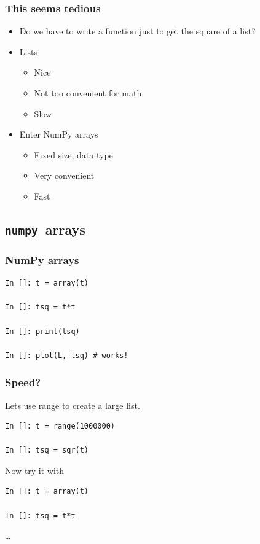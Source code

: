 \documentclass[14pt,compress]{beamer}
\newcounter{time}
\newcommand{\inctime}[1]{\addtocounter{time}{#1}{\tiny \thetime\ m}}
\newcommand{\num}{\texttt{numpy}}
\begin{document}
\begin{frame}[fragile]
  \frametitle{This seems tedious}

  \begin{itemize}
  \item Do we have to write a function just to get the square of a list?
    \item Lists
\begin{itemize}
    \item Nice
    \item Not too convenient for math
    \item Slow
\end{itemize}
\item Enter NumPy arrays
    \begin{itemize}
        \item Fixed size, data type
        \item Very convenient
        \item Fast
    \end{itemize}
  \end{itemize}
  \inctime{10}
\end{frame}

\subsection{\num\ arrays}

\begin{frame}[fragile]
\frametitle{NumPy arrays}
\begin{lstlisting}
In []: t = array(t)

In []: tsq = t*t

In []: print(tsq)

In []: plot(L, tsq) # works!
\end{lstlisting}  %
\end{frame}

\begin{frame}[fragile]
\frametitle{Speed?}

\noindent Lets use range to create a large list.

\begin{lstlisting}
In []: t = range(1000000)

In []: tsq = sqr(t)

\end{lstlisting}  %

\noindent Now try it with

\begin{lstlisting}
In []: t = array(t)

In []: tsq = t*t
\end{lstlisting}
\ldots
\end{frame}
\end{document}
